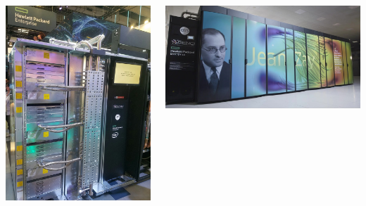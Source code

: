 \documentclass[11pt,xcolor={x11names,svgnames}]{beamer}
\begin{document}
\begin{frame}[label=bragging]
  \begin{columns}
    \begin{column}[T]{3.5cm}
      \includegraphics[height=0.6\textheight]{pictures/jean-zay.jpg}
    \end{column}
    \begin{column}[T]{6cm}
      \includegraphics[width=\textwidth]{pictures/jean_Zay.jpg}


\end{column}
\end{columns}
\end{frame}
\end{document}
